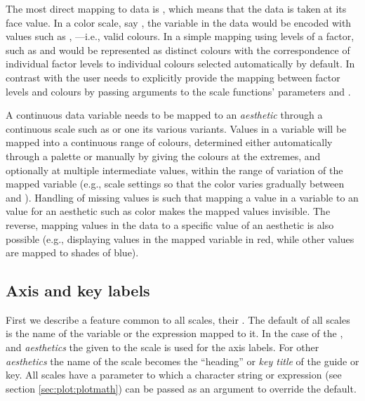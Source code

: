 \documentclass[krantz2]{krantz}\usepackage{knitr}
\begin{document}
The most direct mapping to data is , which means that the data is taken at its face value. In a color scale, say , the variable in the data would be encoded with values such as , ---i.e., valid \Rlang colours. In a simple mapping using  levels of a factor, such as  and  would be represented as distinct colours with the correspondence of individual factor levels to individual colours selected automatically by default. In contrast with  the user needs to explicitly provide the mapping between factor levels and colours by passing arguments to the scale functions' parameters  and .

A continuous data variable needs to be mapped to an \emph{aesthetic} through a continuous scale such as  or one its various variants. Values in a  variable will be mapped into a continuous range of colours, determined either automatically through a palette or manually by giving the colours at the extremes, and optionally at multiple intermediate values, within the range of variation of the mapped variable (e.g.,  scale settings so that the color varies gradually between  and ). Handling of missing values is such that mapping a value in a variable to an  value for an aesthetic such as color makes the mapped values invisible. The reverse, mapping  values in the data to a specific value of an aesthetic is also possible (e.g.,  displaying  values in the mapped variable in red, while other values are mapped to shades of blue).

%
%

\subsection{Axis and key labels}\label{sec:plot:scale:name}\label{sec:plot:labs}
First we describe a feature common to all scales, their . The default  of all scales is the name of the variable or the expression mapped to it. In the case of the ,  and  \emph{aesthetics} the  given to the scale is used for the axis labels. For other \emph{aesthetics} the name of the scale becomes the ``heading'' or \emph{key title} of the guide or key. All scales have a  parameter to which a character string or \Rlang expression (see section \ref{sec:plot:plotmath}) can be passed as an argument to override the default.
\end{document}
